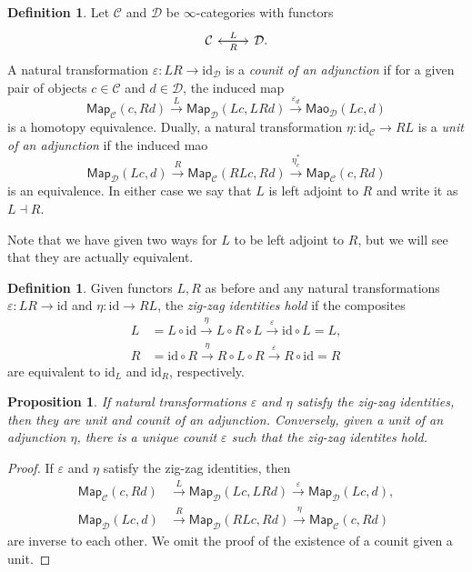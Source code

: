\documentclass[10pt, oneside]{memoir}
\newtheorem{prop}[thm]{Proposition}
\theoremstyle{definition}
\newtheorem{defn}[thm]{Definition}
\theoremstyle{remark}
\theoremstyle{plain}
\theoremstyle{definition}
\theoremstyle{remark}
\newcommand{\ep}{\varepsilon}
\newcommand{\mc}[1]{\mathcal{#1}}
\newcommand{\mr}[1]{\mathrm{#1}}
\newcommand{\ms}[1]{\mathsf{#1}}
\newcommand{\1}{\mathbf{1}}
\newcommand{\2}{\mathbf{2}}
\newcommand{\3}{\mathbf{3}}
\begin{document}
\begin{defn}
    Let $\mc{C}$ and $\mc{D}$ be $\infty$-categories with functors
    \begin{equation*}
    \begin{tikzcd}
        \mc{C} \ar{r}{L} & \mc{D} \ar{l}{R}.
    \end{tikzcd}
    \end{equation*}
    A natural transformation $\ep \colon LR \to \mr{id}_{\mc{D}}$ is a \textit{counit of an adjunction} if for a given pair of objects $c \in \mc{C}$ and $d \in \mc{D}$, the induced map
    \[ \ms{Map}_{\mc{C}}(c, Rd) \xrightarrow{L} \ms{Map}_{\mc{D}}(Lc, LRd) \xrightarrow{\ep_d} \ms{Mao}_{\mc{D}}(Lc, d) \]
    is a homotopy equivalence. Dually, a natural transformation $\eta \colon \mr{id}_{\mc{C}} \to RL$ is a \textit{unit of an adjunction} if the induced mao
    \[ \ms{Map}_{\mc{D}}(Lc, d) \xrightarrow{R} \ms{Map}_{\mc{C}}(RL c, Rd) \xrightarrow{\eta_c^*} \ms{Map}_{\mc{C}}(c, Rd) \]
    is an equivalence. In either case we say that $L$ is left adjoint to $R$ and write it as $L \dashv R$.
\end{defn}

Note that we have given two ways for $L$ to be left adjoint to $R$, but we will see that they are actually equivalent. 

\begin{defn}
    Given functors $L, R$ as before and any natural transformations $\ep \colon LR \to \mr{id}$ and $\eta \colon \mr{id} \to RL$, the \textit{zig-zag identities hold} if the composites
    \begin{align*}
        L &= L \circ \mr{id} \xrightarrow{\eta} L \circ R \circ L \xrightarrow{\ep} \mr{id} \circ L = L, \\
        R &= \mr{id} \circ R \xrightarrow{\eta} R \circ L \circ R \xrightarrow{\ep} R \circ \mr{id} = R
    \end{align*}
    are equivalent to $\mr{id}_L$ and $\mr{id}_R$, respectively.
\end{defn}

\begin{prop}
    If natural transformations $\ep$ and $\eta$ satisfy the zig-zag identities, then they are unit and counit of an adjunction. Conversely, given a unit of an adjunction $\eta$, there is a unique counit $\ep$ such that the zig-zag identites hold.
\end{prop}

\begin{proof}
    If $\ep$ and $\eta$ satisfy the zig-zag identities, then
    \begin{align*}
        \ms{Map}_{\mc{C}}(c, Rd) &\xrightarrow{L} \ms{Map}_{\mc{D}}(Lc, LRd) \xrightarrow{\ep} \ms{Map}_{\mc{D}}(Lc, d), \\
        \ms{Map}_{\mc{D}}(Lc, d) &\xrightarrow{R} \ms{Map}_{\mc{D}}(RLc, Rd) \xrightarrow{\eta} \ms{Map}_{\mc{C}}(c, Rd)
    \end{align*}
    are inverse to each other. We omit the proof of the existence of a counit given a unit.
\end{proof}
\end{document}
